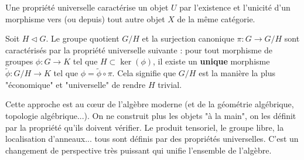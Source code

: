\begin{definition}
    Une propriété universelle caractérise un objet $U$ par l'existence et l'unicité d'un morphisme vers (ou depuis) tout autre objet $X$ de la même catégorie.
\end{definition}

\begin{example}
    Soit $H \triangleleft G$. Le groupe quotient $G/H$ et la surjection canonique $\pi: G \to G/H$ sont caractérisés par la propriété universelle suivante : pour tout morphisme de groupes $\phi: G \to K$ tel que $H \subset \ker(\phi)$, il existe un \textbf{unique} morphisme $\tilde{\phi}: G/H \to K$ tel que $\phi = \tilde{\phi} \circ \pi$.
    Cela signifie que $G/H$ est la manière la plus "économique" et "universelle" de rendre $H$ trivial.
\end{example}

\begin{remark}
    Cette approche est au cœur de l'algèbre moderne (et de la géométrie algébrique, topologie algébrique...). On ne construit plus les objets "à la main", on les définit par la propriété qu'ils doivent vérifier. Le produit tensoriel, le groupe libre, la localisation d'anneaux... tous sont définis par des propriétés universelles. C'est un changement de perspective très puissant qui unifie l'ensemble de l'algèbre.
\end{remark}